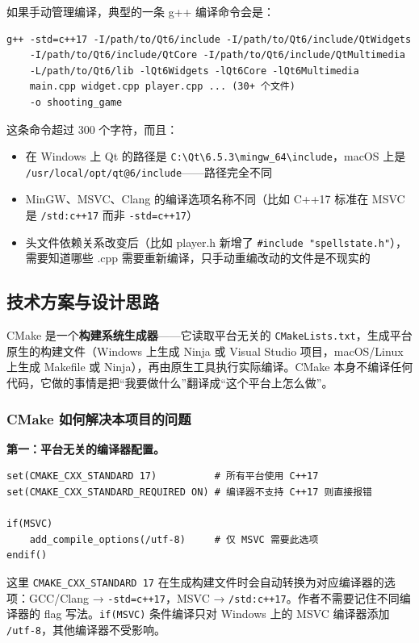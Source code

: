 \documentclass[utf8]{ctexart}
\begin{document}
如果手动管理编译，典型的一条 g++ 编译命令会是：

\begin{verbatim}
g++ -std=c++17 -I/path/to/Qt6/include -I/path/to/Qt6/include/QtWidgets
    -I/path/to/Qt6/include/QtCore -I/path/to/Qt6/include/QtMultimedia
    -L/path/to/Qt6/lib -lQt6Widgets -lQt6Core -lQt6Multimedia
    main.cpp widget.cpp player.cpp ... (30+ 个文件)
    -o shooting_game
\end{verbatim}

这条命令超过 300 个字符，而且：
\begin{itemize}
  \item 在 Windows 上 Qt 的路径是 \texttt{C:\textbackslash Qt\textbackslash 6.5.3\textbackslash mingw\_64\textbackslash include}，macOS 上是 \texttt{/usr/local/opt/qt@6/include}——路径完全不同
  \item MinGW、MSVC、Clang 的编译选项名称不同（比如 C++17 标准在 MSVC 是 \texttt{/std:c++17} 而非 \texttt{-std=c++17}）
  \item 头文件依赖关系改变后（比如 player.h 新增了 \texttt{\#include "spellstate.h"}），需要知道哪些 .cpp 需要重新编译，只手动重编改动的文件是不现实的
\end{itemize}

\subsection{技术方案与设计思路}

CMake 是一个\textbf{构建系统生成器}——它读取平台无关的 \texttt{CMakeLists.txt}，生成平台原生的构建文件（Windows 上生成 Ninja 或 Visual Studio 项目，macOS/Linux 上生成 Makefile 或 Ninja），再由原生工具执行实际编译。CMake 本身不编译任何代码，它做的事情是把“我要做什么”翻译成“这个平台上怎么做”。

\subsubsection{CMake 如何解决本项目的问题}

\textbf{第一：平台无关的编译器配置。}

\begin{verbatim}
set(CMAKE_CXX_STANDARD 17)          # 所有平台使用 C++17
set(CMAKE_CXX_STANDARD_REQUIRED ON) # 编译器不支持 C++17 则直接报错

if(MSVC)
    add_compile_options(/utf-8)     # 仅 MSVC 需要此选项
endif()
\end{verbatim}

这里 \texttt{CMAKE\_CXX\_STANDARD 17} 在生成构建文件时会自动转换为对应编译器的选项：GCC/Clang → \texttt{-std=c++17}，MSVC → \texttt{/std:c++17}。作者不需要记住不同编译器的 flag 写法。\texttt{if(MSVC)} 条件编译只对 Windows 上的 MSVC 编译器添加 \texttt{/utf-8}，其他编译器不受影响。
\end{document}
